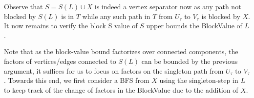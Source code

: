 Observe that $S=S(L)\cup X$ is indeed a vertex separator now as any path not blocked by $S(L)$ is in $T$ while any such path in $T$ from $U_{\tau}$ to $V_{\tau}$ is blocked by $X$. It now remains to verify the block S value of $S$ upper bounds the BlockValue of $L$.\par




Note that as the block-value bound factorizes over connected components, the factors of vertices/edges connected to $S(L)$ can be bounded by the previous argument, it suffices for us to focus on factors on the singleton path from $U_{\tau}$ to $V_{\tau}$.
Towards this end, we first consider a BFS from $X$ using the singleton-step in $L$ to keep track of the change of factors in the BlockValue due to the addition of $X$.\par


